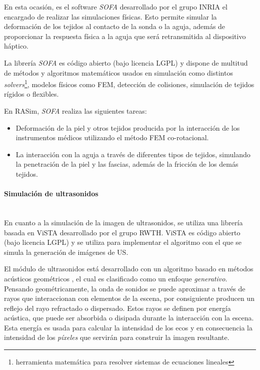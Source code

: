 En esta ocasión, es el software \emph{SOFA} desarrollado por el grupo \ac{INRIA} el encargado de realizar las simulaciones físicas. Esto permite simular la deformación de los tejidos al contacto de la sonda o la aguja, además de proporcionar la respuesta física a la aguja que será retransmitida al dispositivo háptico.

La librería \emph{SOFA} es código abierto (bajo licencia \ac{LGPL}) y dispone de multitud de métodos y algoritmos matemáticos usados en simulación como distintos \emph{solvers}\footnote{herramienta matemática para resolver sistemas de ecuaciones lineales}, modelos físicos como \ac{FEM}, detección de colisiones, simulación de tejidos rígidos o flexibles.

En \ac{RASim}, \emph{SOFA} realiza las siguientes tareas:
\begin{itemize}
    \item Deformación de la piel y otros tejidos producida por la interacción de los instrumentos médicos utilizando el método \ac{FEM} co-rotacional.
    \item La interacción con la aguja a través de diferentes tipos de tejidos, simulando la penetración de la piel y las fascias, además de la fricción de los demás tejidos.
    
\end{itemize}

\paragraph{Simulación de ultrasonidos} \mbox{}\\

En cuanto a la simulación de la imagen de ultrasonidos, se utiliza una librería basada en \ac{ViSTA} desarrollado por el grupo \ac{RWTH}. \ac{ViSTA} es código abierto (bajo licencia \ac{LGPL}) y se utiliza para implementar el algoritmo con el que se simula la generación de imágenes de \ac{US}.

El módulo de ultrasonidos está desarrollado con un algoritmo basado en métodos acústicos geométricos \cite{Law2015}, el cual es clasificado como un enfoque \emph{generativo}. Pensando geométricamente, la onda de sonidos se puede aproximar a través de rayos que interaccionan con elementos de la escena, por consiguiente producen un reflejo del rayo refractado o dispersado. Estos rayos se definen por energía acústica, que puede ser absorbida o disipada durante la interacción con la escena. Esta energía es usada para calcular la intensidad de los ecos y en consecuencia la intensidad de los \emph{píxeles} que servirán para construir la imagen resultante.

